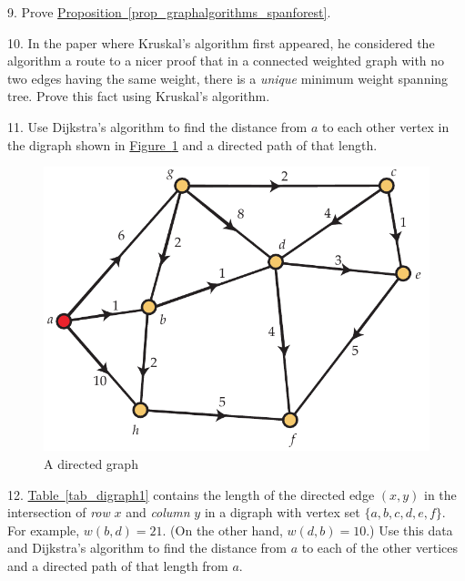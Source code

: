\documentclass[10pt,]{book}
\theoremstyle{plain}
\theoremstyle{definition}
\theoremstyle{definition}
\theoremstyle{definition}
\theoremstyle{definition}
\numberwithin{equation}{section}
\begin{document}
\begin{exerciselist}
\item[9.]\hypertarget{exercise-21}{}\hypertarget{p-254}{}%
Prove \hyperref[prop_graphalgorithms_spanforest]{Proposition~\ref{prop_graphalgorithms_spanforest}}.%
\par\smallskip
\item[10.]\hypertarget{exercise-22}{}\hypertarget{p-255}{}%
In the paper where Kruskal's algorithm first appeared, he considered the algorithm a route to a nicer proof that in a connected weighted graph with no two edges having the same weight, there is a \emph{unique} minimum weight spanning tree. Prove this fact using Kruskal's algorithm.%
\par\smallskip
\item[11.]\hypertarget{exercise-23}{}\hypertarget{p-256}{}%
Use Dijkstra's algorithm to find the distance from \(a\) to each other vertex in the digraph shown in \hyperref[fig_graphalgorithms_dijkstra_ex1]{Figure~\ref{fig_graphalgorithms_dijkstra_ex1}} and a directed path of that length.%
\begin{figure}
\centering
\includegraphics[width=0.65\linewidth]{images/dijkstra_ex1}
\caption{A directed graph\label{fig_graphalgorithms_dijkstra_ex1}}
\end{figure}
\par\smallskip
\item[12.]\hypertarget{exercise-24}{}\hypertarget{p-257}{}%
\hyperref[tab_digraph1]{Table~\ref{tab_digraph1}} contains the length of the directed edge \((x,y)\) in the intersection of \emph{row} \(x\) and \emph{column} \(y\) in a digraph with vertex set \(\{a,b,c,d,e,f\}\). For example, \(w(b,d)=21\). (On the other hand, \(w(d,b)=10\).) Use this data and Dijkstra's algorithm to find the distance from \(a\) to each of the other vertices and a directed path of that length from \(a\).%
\begin{table}
\centering
\begin{tabular}{lAllllll}

\end{tabular}
\end{table}
\end{exerciselist}
\end{document}
